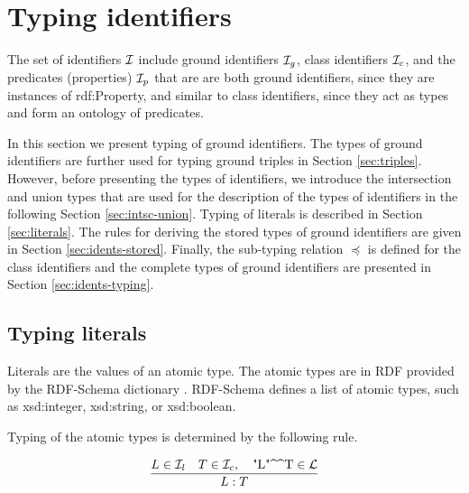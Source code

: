 \documentclass[runningheads]{llncs}
\newcommand{\Lt}{{\cal L}}
\newcommand{\I}{{\cal I}}
\newcommand{\notes}[1]{\noindent\begin{small}-- \emph{#1}\hfill\break\end{small}}
\begin{document}
\section{Typing identifiers}

The set of identifiers $\I$ include ground identifiers $\I_g$, class
identifiers $\I_c$, and the predicates (properties) $\I_p$ that are
are both ground identifiers, since they are instances of rdf:Property,
and similar to class identifiers, since they act as types and form an
ontology of predicates.

In this section we present typing of ground identifiers. The types of
ground identifiers are further used for typing ground triples in
Section \ref{sec:triples}. However, before presenting the types of
identifiers, we introduce the intersection and union types that are
used for the description of the types of identifiers in the following
Section \ref{sec:intsc-union}. Typing of literals is described in
Section \ref{sec:literals}. The rules for deriving the stored types of
ground identifiers are given in Section
\ref{sec:idents-stored}. Finally, the sub-typing relation $\preceq$ is
defined for the class identifiers and the complete types of ground
identifiers are presented in Section \ref{sec:idents-typing}.








\subsection{Typing literals\label{sec:literals}}

Literals are the values of an atomic type. The atomic types are in RDF
provided by the RDF-Schema dictionary \cite{rdfschema}. RDF-Schema
defines a list of atomic types, such as xsd:integer, xsd:string, or
xsd:boolean.

Typing of the atomic types is determined by the following rule.

\begin{equation}
\dfrac{L\in\I_l\quad T\in\I_c,\quad \text{"L"\textasciicircum\textasciicircum\/T}\in\Lt}
      {L:T}  
\end{equation}
\end{document}
